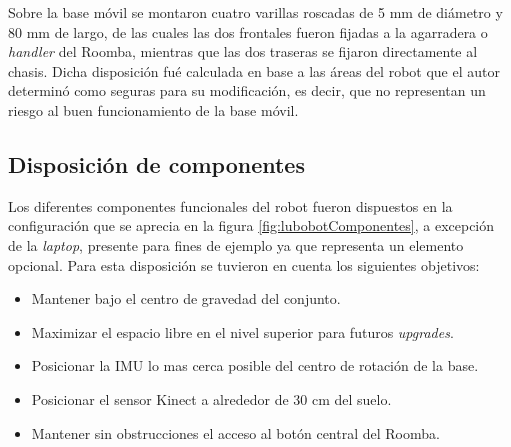 \newpage

Sobre la base móvil se montaron cuatro varillas roscadas de 5 mm de diámetro y 80 mm de largo, de las cuales las dos frontales fueron fijadas a la agarradera o  \textit{handler} del Roomba, mientras que las dos traseras se fijaron directamente al chasis. Dicha disposición fué calculada en base a las áreas del robot que el autor determinó como seguras para su modificación, es decir, que no representan un riesgo al buen funcionamiento de la base móvil.

\subsection{Disposición de componentes}

Los diferentes componentes funcionales del robot fueron dispuestos en la configuración que se aprecia en la figura \ref{fig:lubobotComponentes}, a excepción de la \textit{laptop}, presente para fines de ejemplo ya que representa un elemento opcional. Para esta disposición se tuvieron en cuenta los siguientes objetivos:

\begin{itemize}
  \item Mantener bajo el centro de gravedad del conjunto.
  \item Maximizar el espacio libre en el nivel superior para futuros \textit{upgrades}.
  \item Posicionar la IMU lo mas cerca posible del centro de rotación de la base.
  \item Posicionar el sensor Kinect a alrededor de 30 cm del suelo.
  \item Mantener sin obstrucciones el acceso al botón central del Roomba.
\end{itemize}

